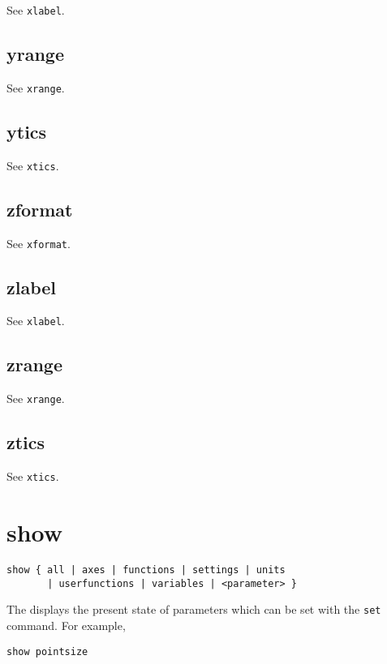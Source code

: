 See {\tt xlabel}.


\subsection{yrange}

See {\tt xrange}.


\subsection{ytics}

See {\tt xtics}.


\subsection{zformat}

See {\tt xformat}.


\subsection{zlabel}

See {\tt xlabel}.


\subsection{zrange}

See {\tt xrange}.


\subsection{ztics}

See {\tt xtics}.


\section{show}

\begin{verbatim}
show { all | axes | functions | settings | units
       | userfunctions | variables | <parameter> }
\end{verbatim}

The  displays the present state of parameters which can be set
with the {\tt set} command. For example,

\begin{verbatim}
show pointsize
\end{verbatim}

